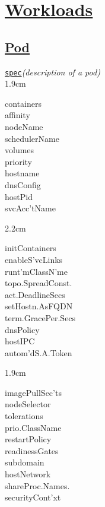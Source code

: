 \section{\href{https://kubernetes.io/docs/concepts/workloads/}{Workloads}}


\subsection*{\href{https://kubernetes.io/docs/concepts/workloads/pods/}{Pod}}

\texttt{\href{https://kubernetes.io/docs/reference/kubernetes-api/workload-resources/pod-v1/}{spec}}\quad\textit{(description of a pod)}\\[-2mm]
\api
{1.9cm}{
containers      \\
affinity        \\
nodeName        \\
schedulerName   \\
volumes         \\
priority        \\
hostname        \\
dnsConfig       \\
hostPid         \\
svcAcc'tName    

}
{2.2cm}{
initContainers  \\
enableS'vcLinks \\
runt'mClassN'me \\
topo.SpreadConst. \\
act.DeadlineSecs\\
setHostn.AsFQDN \\
term.GracePer.Secs\\
dnsPolicy       \\
hostIPC         \\
autom'dS.A.Token  

}
{1.9cm}{
imagePullSec'ts \\
nodeSelector    \\
tolerations     \\
prio.ClassName  \\
restartPolicy   \\
readinessGates  \\
subdomain       \\
hostNetwork     \\
shareProc.Names.\\
securityCont'xt 

}
\stopapi


